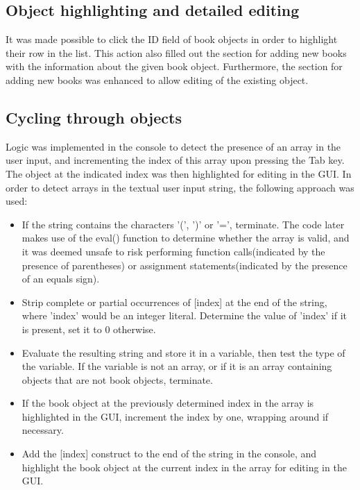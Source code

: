\subsection{Object highlighting and detailed editing}
It was made possible to click the ID field of book objects in order to highlight their row in the list. This action also filled out the section for adding new books with the information about the given book object. Furthermore, the section for adding new books was enhanced to allow editing of the existing object.

\subsection{Cycling through objects}
Logic was implemented in the console to detect the presence of an array in the user input, and incrementing the index of this array upon pressing the Tab key. The object at the indicated index was then highlighted for editing in the GUI. In order to detect arrays in the textual user input string, the following approach was used:
\begin{itemize}
\item If the string contains the characters '(', ')' or '=', terminate. The code later makes use of the eval() function to determine whether the array is valid, and it was deemed unsafe to risk performing function calls(indicated by the presence of parentheses) or assignment statements(indicated by the presence of an equals sign).
\item Strip complete or partial occurrences of [index] at the end of the string, where 'index' would be an integer literal. Determine the value of 'index' if it is present, set it to 0 otherwise.
\item Evaluate the resulting string and store it in a variable, then test the type of the variable. If the variable is not an array, or if it is an array containing objects that are not book objects, terminate.
\item If the book object at the previously determined index in the array is highlighted in the GUI, increment the index by one, wrapping around if necessary.
\item Add the [index] construct to the end of the string in the console, and highlight the book object at the current index in the array for editing in the GUI.
\end{itemize}

